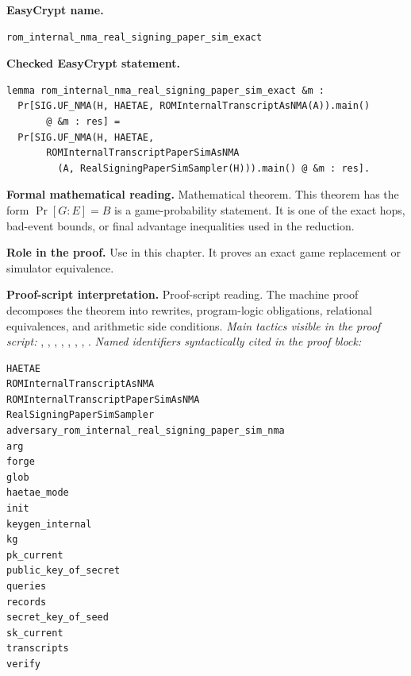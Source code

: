 \begin{formaltheorem}
\noindent\textbf{EasyCrypt name.}
\begin{lstlisting}[language=EasyCrypt,basicstyle=\ttfamily\scriptsize]
rom_internal_nma_real_signing_paper_sim_exact
\end{lstlisting}
\noindent\textbf{Checked EasyCrypt statement.}
\begin{lstlisting}[language=EasyCrypt,basicstyle=\ttfamily\scriptsize]
lemma rom_internal_nma_real_signing_paper_sim_exact &m :
  Pr[SIG.UF_NMA(H, HAETAE, ROMInternalTranscriptAsNMA(A)).main()
       @ &m : res] =
  Pr[SIG.UF_NMA(H, HAETAE,
       ROMInternalTranscriptPaperSimAsNMA
         (A, RealSigningPaperSimSampler(H))).main() @ &m : res].
\end{lstlisting}
\noindent\textbf{Formal mathematical reading.}
Mathematical theorem. This theorem has the form \(\Pr[G:E] = B\) is a game-probability statement.  It is one of the exact hops, bad-event bounds, or final advantage inequalities used in the reduction.

\noindent\textbf{Role in the proof.}
Use in this chapter. It proves an exact game replacement or simulator equivalence.

\noindent\textbf{Proof-script interpretation.}
Proof-script reading. The machine proof decomposes the theorem into rewrites, program-logic obligations, relational equivalences, and arithmetic side conditions.
\emph{Main tactics visible in the proof script:} , , , , , , , .
\emph{Named identifiers syntactically cited in the proof block:}
\begin{lstlisting}[language=EasyCrypt,basicstyle=\ttfamily\scriptsize]
HAETAE
ROMInternalTranscriptAsNMA
ROMInternalTranscriptPaperSimAsNMA
RealSigningPaperSimSampler
adversary_rom_internal_real_signing_paper_sim_nma
arg
forge
glob
haetae_mode
init
keygen_internal
kg
pk_current
public_key_of_secret
queries
records
secret_key_of_seed
sk_current
transcripts
verify
\end{lstlisting}

\end{formaltheorem}

